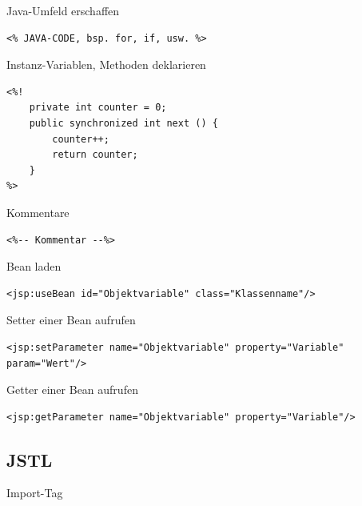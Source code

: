 \documentclass[11pt]{article}
\begin{document}
			Java-Umfeld erschaffen	
			
			\begin{lstlisting}
<% JAVA-CODE, bsp. for, if, usw. %>
			\end{lstlisting}
			
			Instanz-Variablen, Methoden deklarieren
			
			\begin{lstlisting}
<%! 
	private int counter = 0;
	public synchronized int next () {			
		counter++;
		return counter; 
	}
%>
			\end{lstlisting}
			
			Kommentare
			
			\begin{lstlisting}
<%-- Kommentar --%>
			\end{lstlisting}
			
			Bean laden
			
			\begin{lstlisting}
<jsp:useBean id="Objektvariable" class="Klassenname"/>
			\end{lstlisting}			
			
			Setter einer Bean aufrufen
			
			\begin{lstlisting}
<jsp:setParameter name="Objektvariable" property="Variable" param="Wert"/>			
			\end{lstlisting}
			
			Getter einer Bean aufrufen
			
			\begin{lstlisting}
<jsp:getParameter name="Objektvariable" property="Variable"/>
			\end{lstlisting}
			
			
		\subsection{JSTL}	
			
			Import-Tag
			
\end{document}
